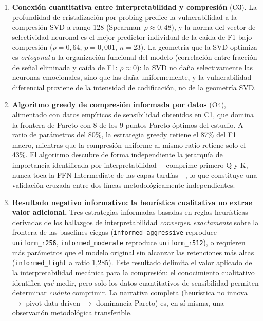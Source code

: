 \begin{enumerate}[label=\textbf{C\arabic*.}]
    \item \textbf{Conexión cuantitativa entre interpretabilidad y compresión}
    (O3). La profundidad de cristalización por probing predice la
    vulnerabilidad a la compresión SVD a rango 128
    (Spearman~$\rho \approx 0{,}48$), y la norma del vector de selectividad
    neuronal es el mejor predictor individual de la caída de F1 bajo
    compresión ($\rho = 0{,}64$, $p = 0{,}001$, $n=23$). La
    geometría que la SVD optimiza es \emph{ortogonal} a la organización
    funcional del modelo (correlación entre fracción de señal eliminada y
    caída de F1: $\rho \approx 0$): la SVD no daña selectivamente las neuronas
    emocionales, sino que las daña uniformemente, y la vulnerabilidad
    diferencial proviene de la intensidad de codificación, no de la geometría
    SVD.

    \item \textbf{Algoritmo greedy de compresión informada por datos} (O4),
    alimentado con datos empíricos de sensibilidad obtenidos en C1, que domina
    la frontera de Pareto con 8 de los 9 puntos Pareto-óptimos del estudio. A
    ratio de parámetros del 80\%, la estrategia greedy retiene el 87\% del F1
    macro, mientras que la compresión uniforme al mismo ratio retiene solo el
    43\%. El algoritmo descubre de forma independiente la jerarquía de
    importancia identificada por interpretabilidad ---comprime primero Q y K,
    nunca toca la FFN Intermediate de las capas tardías---, lo que constituye
    una validación cruzada entre dos líneas metodológicamente independientes.

    \item \textbf{Resultado negativo informativo: la heurística cualitativa
    no extrae valor adicional.} Tres estrategias informadas basadas en reglas
    heurísticas derivadas de los hallazgos de interpretabilidad
    \emph{convergen exactamente} sobre la frontera de las baselines ciegas
    (\texttt{informed\_aggressive} reproduce \texttt{uniform\_r256},
    \texttt{informed\_moderate} reproduce \texttt{uniform\_r512}), o requieren
    más parámetros que el modelo original sin alcanzar las retenciones más
    altas (\texttt{informed\_light} a ratio 1{,}285). Este resultado delimita
    el valor aplicado de la interpretabilidad mecánica para la compresión: el
    conocimiento cualitativo identifica \emph{qué} medir, pero solo los datos
    cuantitativos de sensibilidad permiten determinar \emph{cuánto}
    comprimir. La narrativa completa (heurística no innova $\rightarrow$
    pivot data-driven $\rightarrow$ dominancia Pareto) es, en sí misma, una
    observación metodológica transferible.


\end{enumerate}
